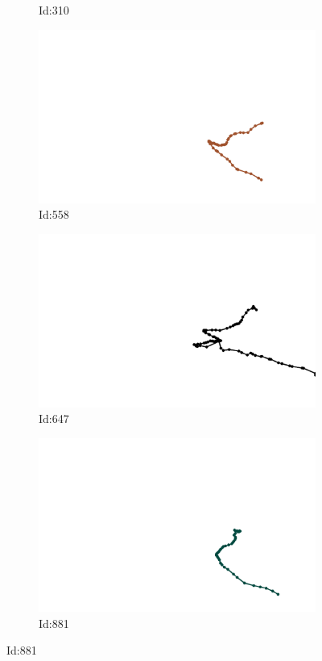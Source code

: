 \documentclass[12pt,twoside]{report}
\begin{document}
\begin{figure}
\begin{subfigure}[b]{0.20\textwidth}
\caption{Id:310}
\end{subfigure}
\begin{subfigure}[b]{0.20\textwidth}
\centering
\includegraphics[width=\textwidth]{../../trajectories/558.png}
\caption{Id:558}
\end{subfigure}
\begin{subfigure}[b]{0.20\textwidth}
\centering
\includegraphics[width=\textwidth]{../../trajectories/647.png}
\caption{Id:647}
\end{subfigure}
\begin{subfigure}[b]{0.20\textwidth}
\centering
\includegraphics[width=\textwidth]{../../trajectories/881.png}
\caption{Id:881}
\end{subfigure}
\end{figure}
\end{document}
